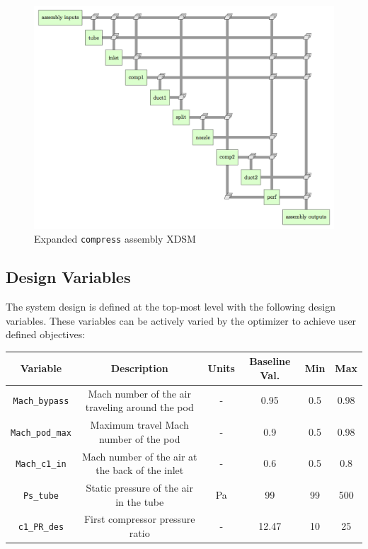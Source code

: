 \documentclass[heading.tex]{subfiles}
\begin{document}
\begin{figure}[hbtp]
\centering
\includegraphics[scale=0.75]{images/compress_assembly_xdsm.png}
\caption{Expanded \texttt{compress} assembly XDSM}
\label{f:compressorXDSM}
\end{figure}

\subsection{Design Variables}
The system design is defined at the top-most level with the following design variables. These variables can be actively varied
 by the optimizer to achieve user defined objectives:

\begin{adjustwidth}{-3cm}{-3cm}
\begin{tabular}{|c|c|c|c|c|c|}
\hline 
Variable & Description & Units & Baseline Val. & Min & Max \\ 
\hline 
\texttt{Mach\_bypass} & Mach number of the air traveling around the pod & - & 0.95 & 0.5 & 0.98 \\ 
\hline 
\texttt{Mach\_pod\_max} & Maximum travel Mach number of the pod & - & 0.9 & 0.5 & 0.98 \\ 
\hline 
\texttt{Mach\_c1\_in} & Mach number of the air at the back of the inlet & - & 0.6 & 0.5 & 0.8 \\ 
\hline 
\texttt{Ps\_tube} & Static pressure of the air in the tube & Pa & 99 & 99 & 500 \\ 
\hline 
\texttt{c1\_PR\_des} & First compressor pressure ratio & - & 12.47 & 10 & 25 \\ 
\hline 
\end{tabular} 
\end{adjustwidth}
\end{document}
